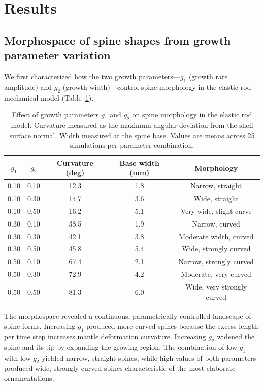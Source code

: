 \documentclass[11pt]{article}
\begin{document}
\section{Results}

\subsection{Morphospace of spine shapes from growth parameter variation}

We first characterized how the two growth parameters---$g_1$ (growth rate amplitude) and $g_2$ (growth width)---control spine morphology in the elastic rod mechanical model (Table~\ref{tab:morphospace}).

\begin{table}[H]
\centering
\caption{Effect of growth parameters $g_1$ and $g_2$ on spine morphology in the elastic rod model. Curvature measured as the maximum angular deviation from the shell surface normal. Width measured at the spine base. Values are means across 25 simulations per parameter combination.}
\label{tab:morphospace}
\begin{tabular}{ccccc}
\toprule
\textbf{$g_1$} & \textbf{$g_2$} & \textbf{Curvature (deg)} & \textbf{Base width (mm)} & \textbf{Morphology} \\
\midrule
0.10 & 0.10 & 12.3 & 1.8 & Narrow, straight \\
0.10 & 0.30 & 14.7 & 3.6 & Wide, straight \\
0.10 & 0.50 & 16.2 & 5.1 & Very wide, slight curve \\
0.30 & 0.10 & 38.5 & 1.9 & Narrow, curved \\
0.30 & 0.30 & 42.1 & 3.8 & Moderate width, curved \\
0.30 & 0.50 & 45.8 & 5.4 & Wide, strongly curved \\
0.50 & 0.10 & 67.4 & 2.1 & Narrow, strongly curved \\
0.50 & 0.30 & 72.9 & 4.2 & Moderate, very curved \\
0.50 & 0.50 & 81.3 & 6.0 & Wide, very strongly curved \\
\bottomrule
\end{tabular}
\end{table}

The morphospace revealed a continuous, parametrically controlled landscape of spine forms. Increasing $g_1$ produced more curved spines because the excess length per time step increases mantle deformation curvature. Increasing $g_2$ widened the spine and its tip by expanding the growing region. The combination of low $g_1$ with low $g_2$ yielded narrow, straight spines, while high values of both parameters produced wide, strongly curved spines characteristic of the most elaborate ornamentations.
\end{document}
